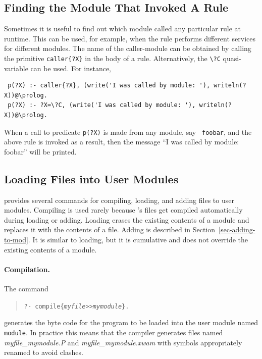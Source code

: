 \documentclass[11pt]{article}
\newcommand{\ERGO}{\mbox{\smaller{\ensuremath{\cal{E}}\smaller{{\sc{RGO}}}}}\xspace}
\newcommand{\FLSYSTEM}{\ERGO}
\newcommand{\bs}{\textbackslash}
\newcommand{\ofile}{xwam}
\begin{document}
\subsection{Finding the Module That Invoked A Rule}

\index{{\tt \bs{}?C} quasi-variable}
Sometimes it is useful to find out which module called any particular rule
at runtime. This can be used, for example, when the rule performs
different services for different modules. The name of the caller-module can
be obtained by calling the primitive {\tt caller\{?X\}}  in the body of a rule.
Alternatively, the \texttt{\bs{}?C} quasi-variable can be used. 
For instance, 
\begin{verbatim}
 p(?X) :- caller{?X}, (write('I was called by module: '), writeln(?X))@\prolog.
 p(?X) :- ?X=\?C, (write('I was called by module: '), writeln(?X))@\prolog.
\end{verbatim}
When a call to predicate {\tt p(?X)} is made from any module, say {\tt
  foobar}, and the above rule is invoked as a result, then the message ``I
was called by module: foobar'' will be printed. 


\subsection{Loading Files into User Modules}\label{sec-loading-mods}


\FLSYSTEM provides several commands for compiling, loading, and adding
files to user modules. 
Compiling is used rarely because \FLSYSTEM's files get compiled
automatically during loading or adding.
Loading erases the existing contents of a module and replaces it with the
contents of a file.
Adding is described in Section~\ref{sec-adding-to-mod}.
It is similar to loading, but it is cumulative and does not
override the existing contents of a module. 

\paragraph{Compilation.}
The command 
\begin{quote}
  {\tt ?- compile\{{\it myfile}>{}>{\it mymodule}\}.}
\end{quote}
generates the byte code for the program to be loaded into the user module
named {\tt module}. In
practice this means that the compiler generates files named
\emph{myfile\_mymodule.P} and \emph{myfile\_mymodule.\ofile} with symbols appropriately
renamed to avoid clashes.
\end{document}
